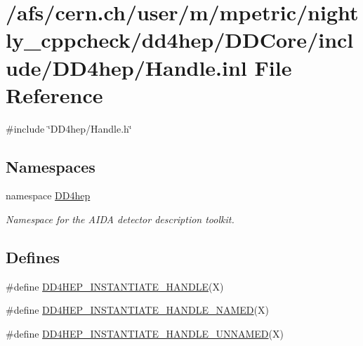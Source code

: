 \hypertarget{_handle_8inl}{
\section{/afs/cern.ch/user/m/mpetric/nightly\_\-cppcheck/dd4hep/DDCore/include/DD4hep/Handle.inl File Reference}
\label{_handle_8inl}
}
{\ttfamily \#include \char`\"{}DD4hep/Handle.h\char`\"{}}\par
\subsection*{Namespaces}
\begin{DoxyCompactItemize}
\item 
namespace \hyperlink{namespace_d_d4hep}{DD4hep}


\begin{DoxyCompactList}\small\item\em Namespace for the AIDA detector description toolkit. \item\end{DoxyCompactList}\end{DoxyCompactItemize}
\subsection*{Defines}
\begin{DoxyCompactItemize}
\item 
\#define \hyperlink{_handle_8inl_ac1a93b92fc9aaa3e60484a966cc20b4f}{DD4HEP\_\-INSTANTIATE\_\-HANDLE}(X)
\item 
\#define \hyperlink{_handle_8inl_a9da33fd2046c253711abd9194ce5265a}{DD4HEP\_\-INSTANTIATE\_\-HANDLE\_\-NAMED}(X)
\item 
\#define \hyperlink{_handle_8inl_ad861f1cd8d1e45907d1e481780fa99d2}{DD4HEP\_\-INSTANTIATE\_\-HANDLE\_\-UNNAMED}(X)
\end{DoxyCompactItemize}


